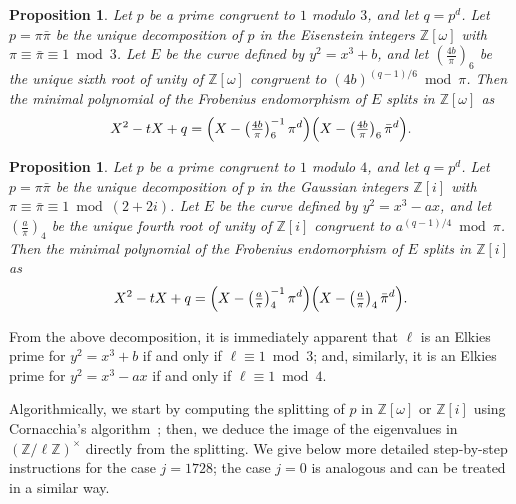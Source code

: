 \documentclass[12pt]{article}
\theoremstyle{plain}
\newtheorem{proposition}[theorem]{Proposition}
\theoremstyle{definition}
\def\Z{\ensuremath{\mathbb{Z}}}
\newcounter{algorithm}
\begin{document}
\begin{proposition}
  Let $p$ be a prime congruent to $1$ modulo $3$, and let $q=p^d$. %
  Let $p=\pi\bar\pi$ be the unique decomposition of $p$ in the
  Eisenstein integers $\Z[\omega]$ with
  $\pi\equiv\bar\pi\equiv1\bmod3$. %
  Let $E$ be the curve defined by $y^2=x^3+b$, and let
  $\left(\tfrac{4b}{\pi}\right)_6$ be the unique sixth root of unity
  of $\Z[\omega]$ congruent to $(4b)^{(q-1)/6}\bmod \pi$. %
  Then the minimal polynomial of the Frobenius endomorphism of $E$
  splits in $\Z[\omega]$ as
  \begin{equation*}
    X^2 - tX + q =
    \Bigl(X - \left(\tfrac{4b}{\pi}\right)_6^{-1}\pi^d\Bigr)
    \Bigl(X - \left(\tfrac{4b}{\pi}\right)_6\bar\pi^d\Bigr).
  \end{equation*}
\end{proposition}

\begin{proposition}
  Let $p$ be a prime congruent to $1$ modulo $4$, and let $q=p^d$. %
  Let $p=\pi\bar\pi$ be the unique decomposition of $p$ in the
  Gaussian integers $\Z[i]$ with
  $\pi\equiv\bar\pi\equiv 1 \bmod (2+2i)$. %
  Let $E$ be the curve defined by $y^2=x^3-ax$, and let
  $\left(\tfrac{a}{\pi}\right)_4$ be the unique fourth root of unity
  of $\Z[i]$ congruent to $a^{(q-1)/4}\bmod \pi$. %
  Then the minimal polynomial of the Frobenius endomorphism of $E$
  splits in $\Z[i]$ as
  \begin{equation*}
    X^2 - tX + q =
    \Bigl(X - \left(\tfrac{a}{\pi}\right)_4^{-1}\pi^d\Bigr)
    \Bigl(X -  \left(\tfrac{a}{\pi}\right)_4\bar\pi^d\Bigr).
  \end{equation*}
\end{proposition}

From the above decomposition, it is immediately apparent that $\ell$
is an Elkies prime for $y^2=x^3+b$ if and only if
$\ell\equiv 1 \bmod 3$; and, similarly, it is an Elkies prime for
$y^2=x^3-ax$ if and only if $\ell\equiv 1 \bmod 4$. %

Algorithmically, we start by computing the splitting of $p$ in
$\Z[\omega]$ or $\Z[i]$ using Cornacchia's
algorithm~\cite{cornacchia1908di}; then, we deduce the image of the
eigenvalues in $(\Z/\ell\Z)^\times$ directly from the splitting. %
We give below more detailed step-by-step instructions for the case
$j=1728$; the case $j=0$ is analogous and can be treated in a similar
way.
\end{document}
